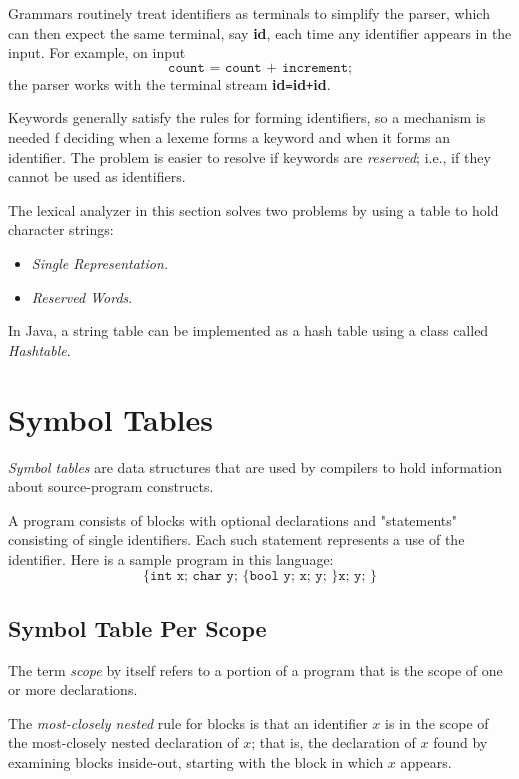\documentclass[a4paper,twoside]{book}
\begin{document}
Grammars routinely treat identifiers as terminals to simplify the parser, which can then expect the same terminal, say \textbf{id}, each time any identifier appears in the input. For example, on input
\begin{equation}
    \texttt{count = count + increment;}
\end{equation}
the parser works with the terminal stream \textbf{id}\texttt{=}\textbf{id}\texttt{+}\textbf{id}.

Keywords generally satisfy the rules for forming identifiers, so a mechanism is needed f deciding when a lexeme forms a keyword and when it forms an identifier. The problem is easier to resolve if keywords are \textit{reserved}; i.e., if they cannot be used as identifiers.

The lexical analyzer in this section solves two problems by using a table to hold character strings:
\begin{itemize}
    \item\textit{Single Representation.}
    \item\textit{Reserved Words}.
\end{itemize}

In Java, a string table can be implemented as a hash table using a class called \textit{Hashtable}.

\section{Symbol Tables}

\textit{Symbol tables} are data structures that are used by compilers to hold information about source-program constructs.

A program consists of blocks with optional declarations and "statements" consisting of single identifiers. Each such statement represents a use of the identifier. Here is a sample program in this language:
\begin{equation}
    \texttt{\{ int x; char y; \{ bool y; x; y; \} x; y; \}}
    \label{2.7}
\end{equation}

\subsection{Symbol Table Per Scope}

The term \textit{scope} by itself refers to a portion of a program that is the scope of one or more declarations.

The \textit{most-closely nested} rule for blocks is that an identifier $x$ is in the scope of the most-closely nested declaration of $x$; that is, the declaration of $x$ found by examining blocks inside-out, starting with the block in which $x$ appears.
\end{document}
